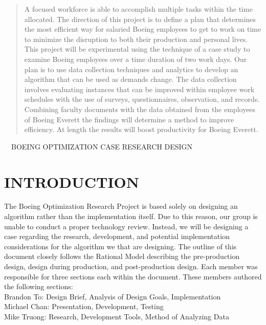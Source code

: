 \documentclass[a4,draftclsnofoot,onecolumn,margin=0.75,10pt]{IEEEtran}
\begin{document}
\begin{abstract}A focused workforce is able to accomplish multiple tasks within the time allocated. The direction of this project is to define a plan that determines the most efficient way for salaried Boeing employees to get to work on time to minimize the disruption to both their production and personal lives. This project will be experimental using the technique of a case study to examine Boeing employees over a time duration of two work days. 
Our plan is to use data collection techniques and analytics to develop an algorithm that can be used as demands change. 
The data collection involves evaluating instances that can be improved within employee work schedules with the use of surveys, questionnaires, observation, and records. 
Combining faculty documents with the data obtained from the employees of Boeing Everett the findings will determine a method to improve efficiency. At length the results will boost productivity for Boeing Everett. 
\end{abstract}



\clearpage\
\foreignlanguage{english}{\MakeUppercase{\ }}\foreignlanguage{english}{\MakeUppercase{Boeing Optimization Case Research Design}}
\par







\bigskip


\tableofcontents


\bigskip

\clearpage\setcounter{page}{1}

\section[INTRODUCTION]{\rmfamily\bfseries\color{black}
INTRODUCTION}
{\color{black}
}
{\color{black}
The Boeing Optimization Research Project is based solely on designing an algorithm rather than the implementation itself. Due to this reason, our group is unable to conduct a proper technology review. Instead, we will be designing a case regarding the research, development, and potential implementation considerations for the algorithm we that are designing. The outline of this document closely follows the Rational Model describing the pre-production design, design during production, and post-production design. Each member was responsible for three sections each within the document. These members authored the following sections:\\ 
Brandon To: Design Brief, Analysis of Design Goals, Implementation\\ 
Michael Chan: Presentation, Development, Testing\\
Mike Truong: Research, Development Tools, Method of Analyzing Data}
\end{document}
